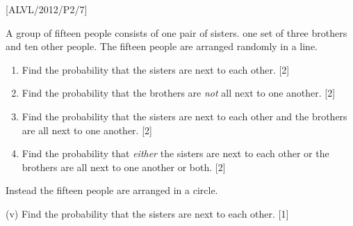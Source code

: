 \item {[}ALVL/2012/P2/7{]}

A group of fifteen people consists of one pair of sisters. one set
of three brothers and ten other people. The fifteen people are arranged
randomly in a line.
\begin{enumerate}
\item Find the probability that the sisters are next to each other. {[}2{]} 
\item Find the probability that the brothers are \emph{not} all next to
one another. {[}2{]} 
\item Find the probability that the sisters are next to each other and the
brothers are all next to one another. {[}2{]} 
\item Find the probability that \emph{either} the sisters are next to each
other or the brothers are all next to one another or both. {[}2{]} 
\end{enumerate}
Instead the fifteen people are arranged in a circle.

(v) Find the probability that the sisters are next to each other.
{[}1{]}
